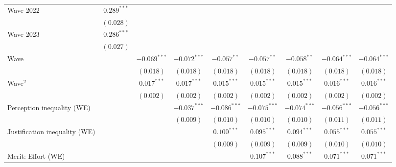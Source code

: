 \documentclass[
  12pt,
]{article}
\begin{document}
\begin{table}
{\begin{center}
{\begin{threeparttable}
\begin{tabular}{l c c c c c c c c}
\quad Wave 2022                      & $0.289^{***}$  &                &                &                &                &                &                &                \\
                                     & $(0.028)$      &                &                &                &                &                &                &                \\
\quad Wave 2023                      & $0.286^{***}$  &                &                &                &                &                &                &                \\
                                     & $(0.027)$      &                &                &                &                &                &                &                \\
Wave                                 &                & $-0.069^{***}$ & $-0.072^{***}$ & $-0.057^{**}$  & $-0.057^{**}$  & $-0.058^{**}$  & $-0.064^{***}$ & $-0.064^{***}$ \\
                                     &                & $(0.018)$      & $(0.018)$      & $(0.018)$      & $(0.018)$      & $(0.018)$      & $(0.018)$      & $(0.018)$      \\
Wave$^2$                             &                & $0.017^{***}$  & $0.017^{***}$  & $0.015^{***}$  & $0.015^{***}$  & $0.015^{***}$  & $0.016^{***}$  & $0.016^{***}$  \\
                                     &                & $(0.002)$      & $(0.002)$      & $(0.002)$      & $(0.002)$      & $(0.002)$      & $(0.002)$      & $(0.002)$      \\
Perception inequality (WE)           &                &                & $-0.037^{***}$ & $-0.086^{***}$ & $-0.075^{***}$ & $-0.074^{***}$ & $-0.056^{***}$ & $-0.056^{***}$ \\
                                     &                &                & $(0.009)$      & $(0.010)$      & $(0.010)$      & $(0.010)$      & $(0.011)$      & $(0.011)$      \\
Justification inequality (WE)        &                &                &                & $0.100^{***}$  & $0.095^{***}$  & $0.094^{***}$  & $0.055^{***}$  & $0.055^{***}$  \\
                                     &                &                &                & $(0.009)$      & $(0.009)$      & $(0.009)$      & $(0.010)$      & $(0.010)$      \\
Merit: Effort (WE)                   &                &                &                &                & $0.107^{***}$  & $0.088^{***}$  & $0.071^{***}$  & $0.071^{***}$  \\

\end{tabular}
\end{threeparttable}}
\end{center}}
\end{table}
\end{document}
